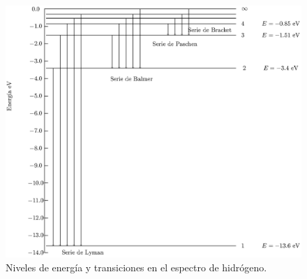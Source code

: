 \begin{figure}[H]
    \centering
    \includegraphics[scale=0.8]{Imagenes/espectrohidrogeno.eps}
    \caption{Niveles de energía y transiciones en el espectro de hidrógeno.}
    \label{fig:figura_espectro_H}
\end{figure}
